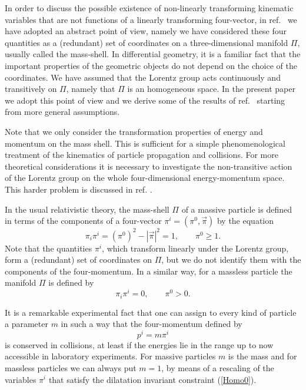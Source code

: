 \documentclass[a4paper,12pt]{article}
\begin{document}
In order to discuss the possible existence of non-linearly transforming kinematic variables that are not functions of a linearly transforming four-vector, in ref.\ \cite{Toller} we have adopted an abstract point of view, namely we have considered these four quantities as a (redundant) set of coordinates on a three-dimensional manifold $\Pi$, usually called the mass-shell. In differential geometry, it is a familiar fact that the important properties of the geometric objects do not depend on the choice of the coordinates. We have assumed that the Lorentz group acts continuously and transitively on $\Pi$, namely that $\Pi$ is an homogeneous space. In the present paper we adopt this point of view and we derive some of the results of ref.\ \cite{Toller} starting from more general assumptions.

Note that we only consider the transformation properties of energy and momentum on the mass shell. This is sufficient for a simple phenomenological treatment of the kinematics of particle propagation and collisions. For more theoretical considerations it is necessary to investigate the non-transitive action of the Lorentz group on the whole four-dimensional energy-momentum space. This harder problem is discussed in ref. \cite{KGN2}.

In the usual relativistic theory, the mass-shell $\Pi$ of a massive particle is defined in terms of the components of a four-vector $\pi^i = (\pi^0, \vec\pi)$ by  the equation
\begin{equation} \label{Homo1}
\pi_i \pi^i = (\pi^0)^2 - |\vec\pi|^2 = 1, \qquad \pi^0 \geq 1.
\end{equation}
Note that the quantities $\pi^i$, which transform linearly under the Lorentz group, form a (redundant) set of coordinates on $\Pi$, but we do not identify them with the components of the four-momentum. In a similar way, for a massless particle the manifold $\Pi$ is defined by
\begin{equation} \label{Homo0}
\pi_i \pi^i = 0, \qquad \pi^0 > 0.
\end{equation}

It is a remarkable experimental fact that one can assign to every kind of particle a parameter $m$ in such a way that the four-momentum defined by
\begin{equation} \label{Mom}
p^i = m \pi^i
\end{equation}
is conserved in collisions, at least if the energies lie in the range up to now accessible in laboratory experiments. For massive particles $m$ is the mass and for massless particles we can always put $m = 1$, by means of a rescaling of the variables $\pi^i$ that satisfy the dilatation invariant constraint (\ref{Homo0}).
\end{document}

